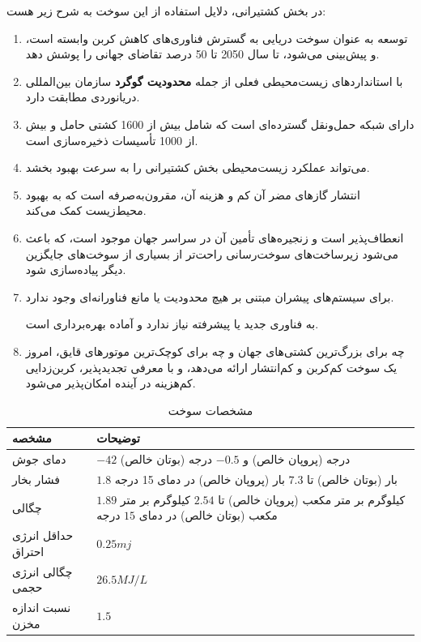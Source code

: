 در بخش کشتیرانی،
دلایل استفاده از این سوخت به شرح زیر هست:
\begin{enumerate}
	\item 
	توسعه 
	 به عنوان سوخت دریایی به گسترش فناوری‌های کاهش کربن وابسته است، و پیش‌بینی می‌شود،
	  تا سال 2050 تا 50 درصد تقاضای جهانی را پوشش دهد.
	\item 
	 با استانداردهای زیست‌محیطی فعلی از جمله \textbf{محدودیت گوگرد} سازمان بین‌المللی دریانوردی 
	  مطابقت دارد.
	\item 
	دارای شبکه حمل‌ونقل گسترده‌ای است که شامل بیش از 1600 کشتی حامل 
	 و بیش از 1000 تأسیسات ذخیره‌سازی است.
	\item  
	می‌تواند عملکرد زیست‌محیطی بخش کشتیرانی را به سرعت بهبود بخشد.
	\item 
	انتشار گازهای مضر آن کم و هزینه آن، مقرون‌به‌صرفه است که به بهبود محیط‌زیست کمک می‌کند.
	\item 
	 انعطاف‌پذیر است و زنجیره‌های تأمین آن در سراسر جهان موجود است، که باعث می‌شود زیرساخت‌های سوخت‌رسانی راحت‌تر از بسیاری از سوخت‌های جایگزین دیگر پیاده‌سازی شود.
	 \item 
	 برای سیستم‌های پیشران مبتنی بر
هیچ محدودیت یا مانع فناورانه‌ای وجود ندارد.
	
	  به فناوری جدید یا پیشرفته نیاز ندارد و آماده بهره‌برداری است.
	 \item 
	 چه برای بزرگ‌ترین کشتی‌های جهان و چه برای کوچک‌ترین موتورهای قایق،
	  امروز یک سوخت کم‌کربن و کم‌انتشار ارائه می‌دهد، و با معرفی 
	  تجدیدپذیر، کربن‌زدایی کم‌هزینه در آینده امکان‌پذیر می‌شود.
\end{enumerate}
\cite{LR_LPG}
	 
\newpage

\begin{table}[h!]
	\centering
	\caption{مشخصات سوخت }
	\label{dsd}
	\begin{tabular}{|m{2cm}|m{12cm}|}
		\hline
		\textbf{مشخصه} & \textbf{توضیحات} \\
		\hline
		دمای جوش   & $-42$ درجه (پروپان خالص) و $-0.5$ درجه (بوتان خالص) \\
		فشار بخار & $1.8$ بار (بوتان خالص) تا $7.3$ بار (پروپان خالص) در دمای 15 درجه\\
		 چگالی & $1.89$ کیلوگرم بر متر مکعب (پروپان خالص) تا $2.54$ کیلوگرم بر متر مکعب (بوتان خالص) در دمای $15$ ‌درجه \\
		حداقل انرژی احتراق & $ 0.25 mj$\\
		چگالی انرژی حجمی &  $  26.5MJ/L $   \\
		نسبت اندازه مخزن & $1.5$  \\
		\hline
	\end{tabular}
\end{table}

